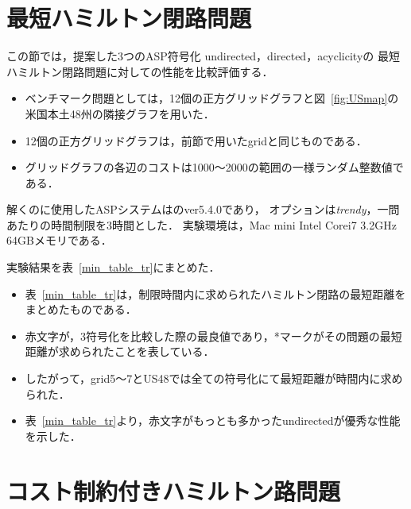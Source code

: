 \section{最短ハミルトン閉路問題}


この節では，提案した3つのASP符号化
\textsf{undirected}，\textsf{directed}，\textsf{acyclicity}の
最短ハミルトン閉路問題に対しての性能を比較評価する．

\begin{itemize}
\item ベンチマーク問題としては，12個の正方グリッドグラフと図~\ref{fig:USmap}の米国本土48州の隣接グラフを用いた．
\item 12個の正方グリッドグラフは，前節で用いたgridと同じものである．
\item グリッドグラフの各辺のコストは1000〜2000の範囲の一様ランダム整数値である．
\end{itemize}

解くのに使用したASPシステムは{\clingo}のver5.4.0であり，
オプションは\textit{trendy}，一問あたりの時間制限を3時間とした．
実験環境は，Mac mini Intel Corei7 3.2GHz 64GBメモリである．

実験結果を表~\ref{min_table_tr}にまとめた．

\begin{itemize}
\item 表~\ref{min_table_tr}は，制限時間内に求められたハミルトン閉路の最短距離をまとめたものである．
\item 赤文字が，3符号化を比較した際の最良値であり，*マークがその問題の最短距離が求められたことを表している．
\item したがって，grid5〜7とUS48では全ての符号化にて最短距離が時間内に求められた．
\item 表~\ref{min_table_tr}より，赤文字がもっとも多かった\textsf{undirected}が優秀な性能を示した．
\end{itemize}

\section{コスト制約付きハミルトン路問題}

